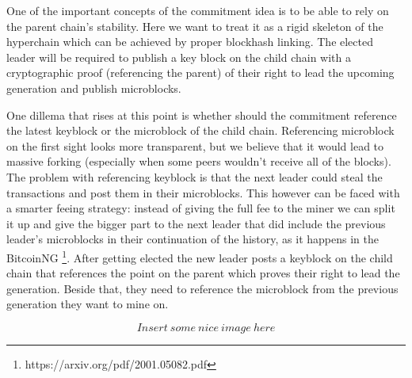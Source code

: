 One of the important concepts of the commitment idea is to be able to rely on
the parent chain's stability. Here we want to treat it as a rigid skeleton
of the hyperchain which can be achieved by proper blockhash linking. The
elected leader will be required to publish a key block on the child chain with a
cryptographic proof (referencing the parent) of their right to lead the
upcoming generation and publish microblocks.

One dillema that rises at this point is whether should the commitment reference
the latest keyblock or the microblock of the child chain. Referencing microblock
on the first sight looks more transparent, but we believe that it would
lead to massive forking (especially when some peers wouldn't receive all of the
blocks). The problem with referencing keyblock is that the next leader could
steal the transactions and post them in their microblocks. This however can be
faced with a smarter feeing strategy: instead of giving the full fee to the
miner we can split it up and give the bigger part to the next leader that did
include the previous leader's microblocks in their continuation of the history,
as it happens in the BitcoinNG
\footnote{https://arxiv.org/pdf/2001.05082.pdf}.
After getting elected the new leader posts a keyblock on the child chain that
references the point on the parent which proves their right to lead the
generation. Beside that, they need to reference the microblock from the previous
generation they want to mine on.

$$Insert\ some\ nice\ image\ here$$


